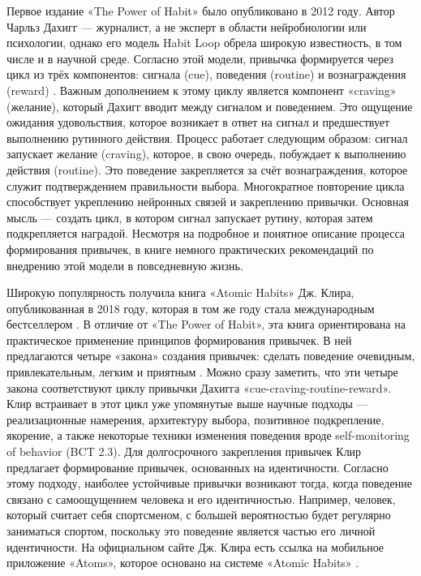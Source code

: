 \documentclass[pdflatex,sn-mathphys-num]{sn-jnl}%
\theoremstyle{thmstyleone}%
\theoremstyle{thmstyletwo}%
\theoremstyle{thmstylethree}%
\begin{document}
Первое издание «The Power of Habit» было опубликовано в 2012 году. Автор Чарльз Дахигг — журналист, а не эксперт в области нейробиологии или психологии, однако его модель Habit Loop обрела широкую известность, в том числе и в научной среде. Согласно этой модели, привычка формируется через цикл из трёх компонентов: сигнала (cue), поведения (routine) и вознаграждения (reward) \cite{duhigg_power_2012}. Важным дополнением к этому циклу является компонент «craving» (желание), который Дахигг вводит между сигналом и поведением. Это ощущение ожидания удовольствия, которое возникает в ответ на сигнал и предшествует выполнению рутинного действия. Процесс работает следующим образом: сигнал запускает желание (craving), которое, в свою очередь, побуждает к выполнению действия (routine). Это поведение закрепляется за счёт вознаграждения, которое служит подтверждением правильности выбора. Многократное повторение цикла способствует укреплению нейронных связей и закреплению привычки. Основная мысль — создать цикл, в котором сигнал запускает рутину, которая затем подкрепляется наградой. Несмотря на подробное и понятное описание процесса формирования привычек, в книге немного практических рекомендаций по внедрению этой модели в повседневную жизнь.

Широкую популярность получила книга «Atomic Habits» Дж. Клира, опубликованная в 2018 году, которая в том же году стала международным бестселлером \cite{noauthor_avery_nodate, editor_james_2022, bureau_james_nodate}. В отличие от «The Power of Habit», эта книга ориентирована на практическое применение принципов формирования привычек. В ней предлагаются четыре «закона» создания привычек: сделать поведение очевидным, привлекательным, легким и приятным \cite{clear_atomic_2018}. Можно сразу заметить, что эти четыре закона соответствуют циклу привычки Дахигга «cue-craving-routine-reward». Клир встраивает в этот цикл уже упомянутые выше научные подходы — реализационные намерения, архитектуру выбора, позитивное подкрепление, якорение, а также некоторые техники изменения поведения вроде self-monitoring of behavior (BCT 2.3). Для долгосрочного закрепления привычек Клир предлагает формирование привычек, основанных на идентичности. Согласно этому подходу, наиболее устойчивые привычки возникают тогда, когда поведение связано с самоощущением человека и его идентичностью. Например, человек, который считает себя спортсменом, с большей вероятностью будет регулярно заниматься спортом, поскольку это поведение является частью его личной идентичности. На официальном сайте Дж. Клира есть ссылка на мобильное приложение «Atoms», которое основано на системе «Atomic Habits» \cite{noauthor_atoms_nodate}.
\end{document}

